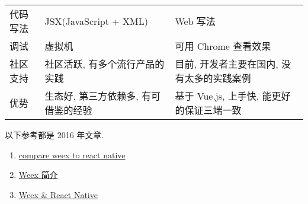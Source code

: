 \begin{longtable}[]{@{}lll@{}}
\begin{minipage}[t]{0.05\columnwidth}\raggedright\strut
代码写法\strut
\end{minipage} & \begin{minipage}[t]{0.05\columnwidth}\raggedright\strut
JSX(JavaScript + XML)\strut
\end{minipage} & \begin{minipage}[t]{0.05\columnwidth}\raggedright\strut
Web 写法\strut
\end{minipage}\tabularnewline
\begin{minipage}[t]{0.05\columnwidth}\raggedright\strut
调试\strut
\end{minipage} & \begin{minipage}[t]{0.05\columnwidth}\raggedright\strut
虚拟机\strut
\end{minipage} & \begin{minipage}[t]{0.05\columnwidth}\raggedright\strut
可用 Chrome 查看效果\strut
\end{minipage}\tabularnewline
\begin{minipage}[t]{0.05\columnwidth}\raggedright\strut
社区支持\strut
\end{minipage} & \begin{minipage}[t]{0.05\columnwidth}\raggedright\strut
社区活跃, 有多个流行产品的实践\strut
\end{minipage} & \begin{minipage}[t]{0.05\columnwidth}\raggedright\strut
目前, 开发者主要在国内, 没有太多的实践案例\strut
\end{minipage}\tabularnewline
\begin{minipage}[t]{0.05\columnwidth}\raggedright\strut
优势\strut
\end{minipage} & \begin{minipage}[t]{0.05\columnwidth}\raggedright\strut
生态好, 第三方依赖多, 有可借鉴的经验\strut
\end{minipage} & \begin{minipage}[t]{0.05\columnwidth}\raggedright\strut
基于 Vue.js, 上手快, 能更好的保证三端一致\strut
\end{minipage}\tabularnewline
\bottomrule
\end{longtable}

以下参考都是 2016 年文章.

\begin{enumerate}
\def\labelenumi{\arabic{enumi}.}
\tightlist
\item
  \href{https://www.gitbook.com/book/xiaomaer/compare-weex-to-react-native/details}{compare
  weex to react native}
\item
  \href{http://slides.com/ciyinhuang/weex\#/}{Weex 简介}
\item
  \href{http://zfx5130.me/blog/2016/09/15/Weex-\&-React-Native/}{Weex \&
  React Native}
\end{enumerate}

